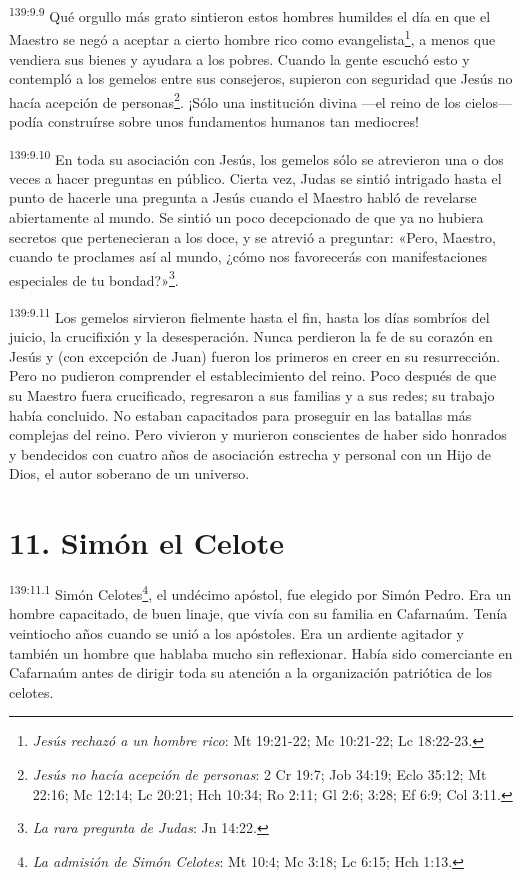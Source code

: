 \par 
\textsuperscript{139:9.9} Qué orgullo más grato sintieron estos hombres humildes el día en que el Maestro se negó a aceptar a cierto hombre rico como evangelista\footnote{\textit{Jesús rechazó a un hombre rico}: Mt 19:21-22; Mc 10:21-22; Lc 18:22-23.}, a menos que vendiera sus bienes y ayudara a los pobres. Cuando la gente escuchó esto y contempló a los gemelos entre sus consejeros, supieron con seguridad que Jesús no hacía acepción de personas\footnote{\textit{Jesús no hacía acepción de personas}: 2 Cr 19:7; Job 34:19; Eclo 35:12; Mt 22:16; Mc 12:14; Lc 20:21; Hch 10:34; Ro 2:11; Gl 2:6; 3:28; Ef 6:9; Col 3:11.}. ¡Sólo una institución divina ---el reino de los cielos--- podía construírse sobre unos fundamentos humanos tan mediocres!

\par 
\textsuperscript{139:9.10} En toda su asociación con Jesús, los gemelos sólo se atrevieron una o dos veces a hacer preguntas en público. Cierta vez, Judas se sintió intrigado hasta el punto de hacerle una pregunta a Jesús cuando el Maestro habló de revelarse abiertamente al mundo. Se sintió un poco decepcionado de que ya no hubiera secretos que pertenecieran a los doce, y se atrevió a preguntar: «Pero, Maestro, cuando te proclames así al mundo, ¿cómo nos favorecerás con manifestaciones especiales de tu bondad?»\footnote{\textit{La rara pregunta de Judas}: Jn 14:22.}.

\par 
\textsuperscript{139:9.11} Los gemelos sirvieron fielmente hasta el fin, hasta los días sombríos del juicio, la crucifixión y la desesperación. Nunca perdieron la fe de su corazón en Jesús y (con excepción de Juan) fueron los primeros en creer en su resurrección. Pero no pudieron comprender el establecimiento del reino. Poco después de que su Maestro fuera crucificado, regresaron a sus familias y a sus redes; su trabajo había concluido. No estaban capacitados para proseguir en las batallas más complejas del reino. Pero vivieron y murieron conscientes de haber sido honrados y bendecidos con cuatro años de asociación estrecha y personal con un Hijo de Dios, el autor soberano de un universo.

\section*{11. Simón el Celote}
\par 
\textsuperscript{139:11.1} Simón Celotes\footnote{\textit{La admisión de Simón Celotes}: Mt 10:4; Mc 3:18; Lc 6:15; Hch 1:13.}, el undécimo apóstol, fue elegido por Simón Pedro. Era un hombre capacitado, de buen linaje, que vivía con su familia en Cafarnaúm. Tenía veintiocho años cuando se unió a los apóstoles. Era un ardiente agitador y también un hombre que hablaba mucho sin reflexionar. Había sido comerciante en Cafarnaúm antes de dirigir toda su atención a la organización patriótica de los celotes.

